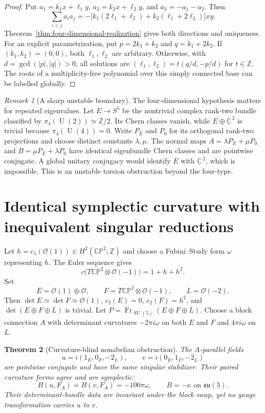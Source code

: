 \documentclass[11pt]{amsart}
\newcommand{\Fr}{\operatorname{Fr}}
\newcommand{\SU}{\operatorname{SU}}
\newcommand{\U}{\operatorname{U}}
\newcommand{\Z}{\mathbb Z}
\newcommand{\C}{\mathbb C}
\theoremstyle{plain}
\newtheorem{theorem}{Theorem}[section]
\theoremstyle{definition}
\theoremstyle{remark}
\newtheorem{remark}[theorem]{Remark}
\begin{document}
\begin{proof}
Put $a_1=k_1x+\ell_1y$, $a_2=k_2x+\ell_2y$, and
$a_3=-a_1-a_2$. Then
\[
 \sum_{i<j}a_i a_j
 =-\bigl[k_1(2\ell_1+\ell_2)
          +k_2(\ell_1+2\ell_2)\bigr]xy.
\]
Theorem~\ref{thm:four-dimensional-realization} gives both directions
and uniqueness. For an explicit parametrization, put
$p=2k_1+k_2$ and $q=k_1+2k_2$. If $(k_1,k_2)=(0,0)$, both
$\ell_1,\ell_2$ are arbitrary. Otherwise, with
$d=\gcd(|p|,|q|)>0$, all solutions are
$(\ell_1,\ell_2)=t(q/d,-p/d)$ for $t\in\Z$.
The roots of a multiplicity-free polynomial over this simply
connected base can be labelled globally.
\end{proof}

\begin{remark}[A sharp unstable boundary]
The four-dimensional hypothesis matters for repeated eigenvalues.
Let $E\to S^5$ be the nontrivial complex rank-two bundle classified
by $\pi_4(\U(2))\simeq\Z/2$. Its Chern classes vanish, while
$E\oplus\underline{\C}^{\,2}$ is trivial because
$\pi_4(\U(4))=0$. Write $P_E$ and $P_0$ for its orthogonal rank-two
projections and choose distinct constants $\lambda,\mu$. The normal
maps $A=\lambda P_E+\mu P_0$ and
$B=\mu P_E+\lambda P_0$ have identical eigenbundle
Chern classes and are pointwise conjugate. A global unitary conjugacy
would identify $E$ with $\underline{\C}^{\,2}$, which is impossible.
This is an unstable torsion obstruction beyond the four-type.
\end{remark}

\section{Identical symplectic curvature with inequivalent singular reductions}

Let $h=c_1(\mathcal O(1))\in H^2(\mathbb{CP}^2;\Z)$ and choose a Fubini--Study form $\omega$ representing $h$. The Euler sequence gives
\[
 c\bigl(T\mathbb{CP}^2\otimes\mathcal O(-1)\bigr)=1+h+h^2.
\]
Set
\[
 E=\mathcal O(1)\oplus\mathcal O,
 \qquad F=T\mathbb{CP}^2\otimes\mathcal O(-1),
 \qquad L=\mathcal O(-2).
\]
Then $\det E\simeq\det F\simeq\mathcal O(1)$, $c_2(E)=0$, $c_2(F)=h^2$, and $\det(E\oplus F\oplus L)$ is trivial. Let $P=\Fr_{\SU(5)}(E\oplus F\oplus L)$. Choose a block connection $A$ with determinant curvatures $-2\pi i\omega$ on both $E$ and $F$ and $4\pi i\omega$ on $L$.

\begin{theorem}[Curvature-blind nonabelian obstruction]\label{thm:cp2}
The $A$-parallel fields
\[
 u=i(1_E,0_F,-2_L),\qquad
 v=i(0_E,1_F,-2_L)
\]
are pointwise conjugate and have the same singular stabilizer. Their paired curvature forms agree and are symplectic:
\[
 B(u,F_A)=B(v,F_A)=-100\pi\omega,
 \qquad B=-\kappa\text{ on }\mathfrak{su}(5).
\]
Their determinant-bundle data are invariant under the block swap, yet no gauge transformation carries $u$ to $v$.
\end{theorem}
\end{document}
